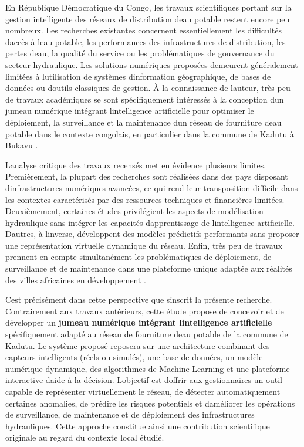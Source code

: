 \documentclass[12pt,a4paper,oneside]{report}
\begin{document}
En République Démocratique du Congo, les travaux scientifiques portant
sur la gestion intelligente des réseaux de distribution
d\textquotesingle eau potable restent encore peu nombreux. Les
recherches existantes concernent essentiellement les difficultés
d\textquotesingle accès à l\textquotesingle eau potable, les
performances des infrastructures de distribution, les pertes
d\textquotesingle eau, la qualité du service ou les problématiques de
gouvernance du secteur hydraulique. Les solutions numériques proposées
demeurent généralement limitées à l\textquotesingle utilisation de
systèmes d\textquotesingle information géographique, de bases de données
ou d\textquotesingle outils classiques de gestion. À la connaissance de
l\textquotesingle auteur, très peu de travaux académiques se sont
spécifiquement intéressés à la conception d\textquotesingle un jumeau
numérique intégrant l\textquotesingle intelligence artificielle pour
optimiser le déploiement, la surveillance et la maintenance
d\textquotesingle un réseau de fourniture d\textquotesingle eau potable
dans le contexte congolais, en particulier dans la commune de Kadutu à
Bukavu \cite{ref78}.

L\textquotesingle analyse critique des travaux recensés met en évidence
plusieurs limites. Premièrement, la plupart des recherches sont
réalisées dans des pays disposant d\textquotesingle infrastructures
numériques avancées, ce qui rend leur transposition difficile dans les
contextes caractérisés par des ressources techniques et financières
limitées. Deuxièmement, certaines études privilégient les aspects de
modélisation hydraulique sans intégrer les capacités
d\textquotesingle apprentissage de l\textquotesingle intelligence
artificielle. D\textquotesingle autres, à l\textquotesingle inverse,
développent des modèles prédictifs performants sans proposer une
représentation virtuelle dynamique du réseau. Enfin, très peu de travaux
prennent en compte simultanément les problématiques de déploiement, de
surveillance et de maintenance dans une plateforme unique adaptée aux
réalités des villes africaines en développement \cite{ref79}.

C\textquotesingle est précisément dans cette perspective que
s\textquotesingle inscrit la présente recherche. Contrairement aux
travaux antérieurs, cette étude propose de concevoir et de développer un
\textbf{jumeau numérique intégrant l\textquotesingle intelligence
artificielle} spécifiquement adapté au réseau de fourniture
d\textquotesingle eau potable de la commune de Kadutu. Le système
proposé reposera sur une architecture combinant des capteurs
intelligents (réels ou simulés), une base de données, un modèle
numérique dynamique, des algorithmes de Machine Learning et une
plateforme interactive d\textquotesingle aide à la décision.
L\textquotesingle objectif est d\textquotesingle offrir aux
gestionnaires un outil capable de représenter virtuellement le réseau,
de détecter automatiquement certaines anomalies, de prédire les risques
potentiels et d\textquotesingle améliorer les opérations de
surveillance, de maintenance et de déploiement des infrastructures
hydrauliques. Cette approche constitue ainsi une contribution
scientifique originale au regard du contexte local étudié.
\end{document}
